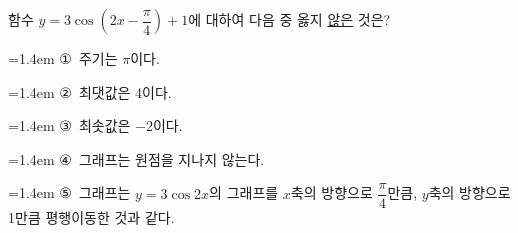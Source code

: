 함수 $y=3\cos\left(2x-\dfrac{\pi}{4}\right)+1$에 대하여 다음 중 옳지 \underline{않은} 것은?
\par\medskip\par\noindent\hangindent=1.4em {\small ①}\ 주기는 $\pi$이다.\par\noindent\hangindent=1.4em {\small ②}\ 최댓값은 4이다.\par\noindent\hangindent=1.4em {\small ③}\ 최솟값은 $-2$이다.\par\noindent\hangindent=1.4em {\small ④}\ 그래프는 원점을 지나지 않는다.\par\noindent\hangindent=1.4em {\small ⑤}\ 그래프는 $y=3\cos 2x$의 그래프를 $x$축의 방향으로 $\dfrac{\pi}{4}$만큼, $y$축의 방향으로 1만큼 평행이동한 것과 같다.\par\medskip
